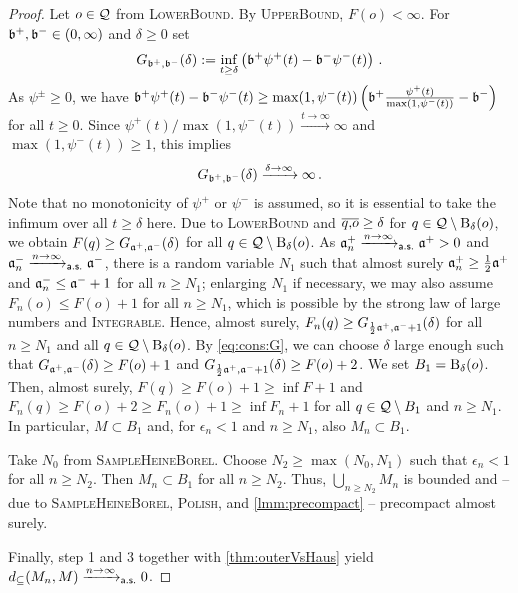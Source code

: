 \begin{proof}
Let $o\in\mathcal{Q}$ from \textsc{LowerBound}. By \textsc{UpperBound}, $F(o) < \infty$. For $\mathfrak{b}^+, \mathfrak{b}^- \in(0,\infty)$ and $\delta \geq 0$ set
\begin{equation*}
	G_{\mathfrak{b}^+, \mathfrak{b}^-}(\delta)
	:=
	\inf_{t \geq \delta} \left( \mathfrak{b}^+ \psi^+(t) - \mathfrak{b}^- \psi^-(t) \right)
	\, .
\end{equation*}
As $\psi^\pm \geq 0$, we have $\mathfrak{b}^+ \psi^+(t) - \mathfrak{b}^- \psi^-(t) \geq \max(1,\psi^-(t)) \left( \mathfrak{b}^+ \frac{\psi^+(t)}{\max(1,\psi^-(t))} - \mathfrak{b}^- \right)$ for all $t\geq0$. Since $\psi^+(t)/\max(1, \psi^-(t))\xrightarrow{t\to\infty}\infty$ and $\max(1,\psi^-(t))\geq1$, this implies
\begin{equation}\label{eq:cons:G}
	G_{\mathfrak{b}^+, \mathfrak{b}^-}(\delta) \xrightarrow{\delta\to\infty} \infty
	\, .
\end{equation}
Note that no monotonicity of $\psi^+$ or $\psi^-$ is assumed, so it is essential to take the infimum over all $t \geq \delta$ here.
Due to \textsc{LowerBound} and $\overline{q,\!o} \geq \delta$ for $q \in \mathcal{Q}\setminus\operatorname{\mathrm{B}}_\delta(o)$, we obtain $F(q) \geq G_{\mathfrak{a}^+, \mathfrak{a}^-}(\delta)$ for all $q\in\mathcal{Q}\setminus \operatorname{\mathrm{B}}_\delta(o)$.
As $\mathfrak{a}^+_n \xrightarrow{n\to\infty}_{\mathsf{a.s.}} \mathfrak{a}^+ > 0$ and $\mathfrak{a}^-_n \xrightarrow{n\to\infty}_{\mathsf{a.s.}} \mathfrak{a}^-$, there is a random variable $N_1$ such that almost surely $\mathfrak{a}^+_n \geq \frac12 \mathfrak{a}^+$ and $\mathfrak{a}^-_n \leq \mathfrak{a}^- +1$ for all $n\geq N_1$; enlarging $N_1$ if necessary, we may also assume $F_n(o) \leq F(o) + 1$ for all $n \geq N_1$, which is possible by the strong law of large numbers and \textsc{Integrable}. Hence, almost surely, $F_n(q) \geq G_{\frac12\mathfrak{a}^+, \mathfrak{a}^-+1}(\delta)$ for all $n\geq N_1$ and all $q\in\mathcal{Q}\setminus \operatorname{\mathrm{B}}_\delta(o)$.
By \eqref{eq:cons:G}, we can choose $\delta$ large enough such that $G_{\mathfrak{a}^+, \mathfrak{a}^-}(\delta) \geq F(o) + 1$ and $G_{\frac12\mathfrak{a}^+, \mathfrak{a}^-+1}(\delta) \geq F(o) + 2$. We set $B_1 = \operatorname{\mathrm{B}}_\delta(o)$.
Then, almost surely, $F(q) \geq F(o) + 1 \geq \inf F + 1$ and $F_n(q) \geq F(o)+2 \geq F_n(o) + 1 \geq \inf F_n + 1$ for all $q\in \mathcal{Q} \setminus B_1$ and $n \geq N_1$. In particular, $M \subset B_1$ and, for $\epsilon_n < 1$ and $n\geq N_1$, also $M_n \subset B_1$.

%
\noindent
\underline{}
Take $N_0$ from \textsc{SampleHeineBorel}. Choose $N_2\geq \max(N_0, N_1)$ such that $\epsilon_n < 1$ for all $n \geq N_2$. Then $M_n \subset B_1$ for all $n\geq N_2$. Thus, $\bigcup_{n\geq N_2}M_n$ is bounded and -- due to \textsc{SampleHeineBorel}, \textsc{Polish}, and \autoref{lmm:precompact} -- precompact almost surely. 

\noindent
\underline{}
Finally, step 1 and 3 together with \autoref{thm:outerVsHaus} yield $d_\subseteq(M_n, M) \xrightarrow{n\to\infty}_{\mathsf{a.s.}} 0$.
\end{proof}
%
%
%
